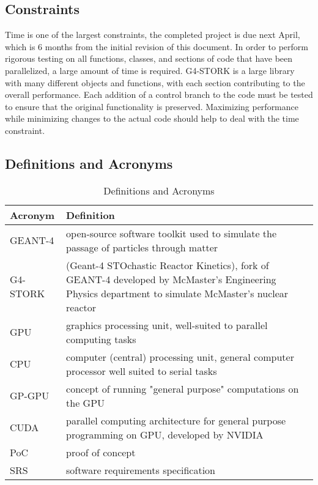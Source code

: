 \documentclass[12pt]{article}
\begin{document}
\subsection{Constraints} %
Time is one of the largest constraints, the completed project is due next April, which is 6 months from the initial revision of this document. In order to perform rigorous testing on all functions, classes, and sections of code that have been parallelized, a  large amount of time is required. G4-STORK is a large library with many different objects and functions, with each section contributing to the overall performance. Each addition of a control branch to the code must be tested to ensure that the original functionality is preserved. Maximizing performance while minimizing changes to the actual code should help to deal with the time constraint.


\subsection{Definitions and Acronyms} %
\begin{centering}
\begin{longtable}{>{\raggedright\arraybackslash}p{}>{\raggedright\arraybackslash}p{}}
\caption{Definitions and Acronyms}\label{Table_Acronyms}\\\toprule
\bf Acronym & \bf Definition\\\midrule
GEANT-4 & open-source software toolkit used to simulate the passage of particles through matter\\
G4-STORK & (Geant-4 STOchastic Reactor Kinetics), fork of GEANT-4 developed by McMaster's Engineering Physics department to simulate McMaster's nuclear reactor\\
GPU & graphics processing unit, well-suited to parallel computing tasks\\
CPU & computer (central) processing unit, general computer processor well suited to serial tasks\\
GP-GPU & concept of running "general purpose" computations on the GPU\\
CUDA & parallel computing architecture for general purpose programming on GPU, developed by NVIDIA\\
PoC & proof of concept\\
SRS & software requirements specification\\\bottomrule
\end{longtable}
\end{centering}
\end{document}
